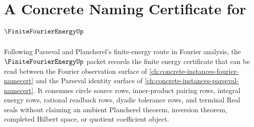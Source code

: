 \chapter{A Concrete Naming Certificate for $\FiniteFourierEnergyUp$}
\label{ch:concrete-instances-finite-fourier-energy-namecert}

Following Parseval and Plancherel's finite-energy route in Fourier analysis, the $\FiniteFourierEnergyUp$ packet records the finite energy certificate that can be read between the Fourier observation surface of \autoref{ch:concrete-instances-fourier-namecert} and the Parseval identity surface of \autoref{ch:concrete-instances-parseval-namecert}. It consumes circle source rows, inner-product pairing rows, integral energy rows, rational readback rows, dyadic tolerance rows, and terminal Real seals without claiming an ambient Plancherel theorem, inversion theorem, completed Hilbert space, or quotient coefficient object.

